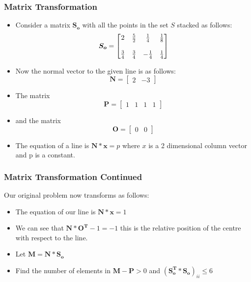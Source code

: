 \documentclass[xcolor=dvipsnames]{beamer}
\begin{document}
\begin{frame}
\frametitle{Matrix Transformation}
\begin{itemize}
\item<1-> Consider a matrix $\boldsymbol{S_o}$ with all the points in the set $S$ stacked as follows: 
\[
 \boldsymbol{S_o} =
\begin{bmatrix}
    2  & $\(\frac{5}{2}\)$ & $\(\frac{1}{4}\)$ & $\(\frac{1}{8}\)$ \\~\\
    $\(\frac{3}{4}\)$ & $\(\frac{3}{4}\)$ & $\(-\frac{1}{4}\)$ &$\(\frac{1}{4}\)$\\
    
\end{bmatrix}
\]
\item<2-> Now the normal vector to the given line is as follows:
\[
 \boldsymbol{N} =
\begin{bmatrix}
    2  & -3
\end{bmatrix}
\]
\item<3-> The matrix
\[
 \boldsymbol{P} =
\begin{bmatrix}
    1 & 1 & 1 & 1
\end{bmatrix}
\]

\item<4-> and the matrix
\[
 \boldsymbol{O} =
\begin{bmatrix}
    0  & 0
\end{bmatrix}
\]
\item<5->The equation of a line is $\boldsymbol{N}*\boldsymbol{x} = p$ where $x$ is a 2 dimensional column vector and p is a constant.
\end{itemize}

\end{frame}


\begin{frame}
\frametitle{Matrix Transformation Continued}
Our original problem now transforms as follows:
\begin{itemize}
 \item<1-> The equation of our line is $\boldsymbol{N}*\boldsymbol{x} = 1$ 
 \item<2-> We can see that $\boldsymbol{N}*\boldsymbol{O^{T}} - 1 = -1$ this is the relative position of the centre with respect to the line.
 \item<3->Let $\boldsymbol{M} = \boldsymbol{N}*\boldsymbol{S_o}$
 \item<4-> Find the number of elements in $\boldsymbol{M}-\boldsymbol{P} > 0$ and $(\boldsymbol{S_o^{T}}*\boldsymbol{S_o})_{ii}\leqslant 6$
\end{itemize}

\end{frame}
\end{document}

